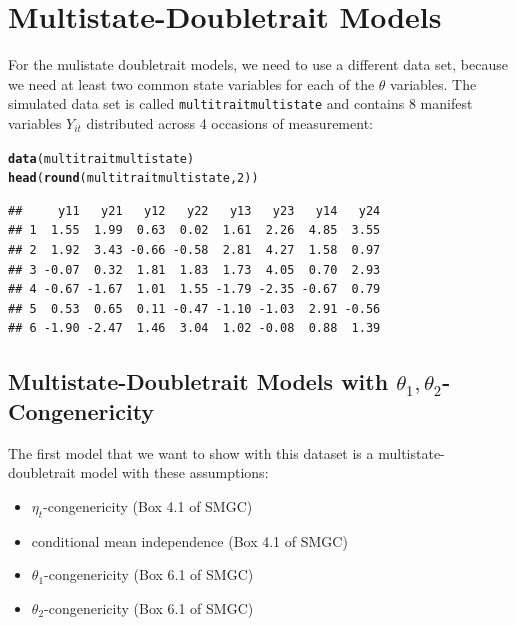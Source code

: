 \documentclass[10pt]{article}\usepackage{graphicx, color}
\makeatletter
\newcommand{\hlfunctioncall}[1]{\textcolor[rgb]{0.501960784313725,0,0.329411764705882}{\textbf{#1}}}%
\newenvironment{kframe}{%
 \def\at@end@of@kframe{}%
 \ifinner\ifhmode%
  \def\at@end@of@kframe{\end{minipage}}%
  \begin{minipage}{\columnwidth}%
 \fi\fi%
 \def\FrameCommand##1{\hskip\@totalleftmargin \hskip-\fboxsep
 \colorbox{shadecolor}{##1}\hskip-\fboxsep
     \hskip-\linewidth \hskip-\@totalleftmargin \hskip\columnwidth}%
 \MakeFramed {\advance\hsize-\width
   \@totalleftmargin\z@ \linewidth\hsize
   \@setminipage}}%
 {\par\unskip\endMakeFramed%
 \at@end@of@kframe}
\newenvironment{knitrout}{}{} %
\makeatother
\begin{document}
%



\newpage
\section{Multistate-Doubletrait Models}

For the mulistate doubletrait models, we need to use a different data set, because we need at least two common state variables for each of the $\theta$ variables. The simulated data set is called \texttt{multitraitmultistate} and contains 8 manifest variables $Y_{it}$ distributed across 4 occasions of measurement:

%
\begin{knitrout}
\color{fgcolor}\begin{kframe}
\begin{alltt}
\hlfunctioncall{data}(multitraitmultistate)
\hlfunctioncall{head}(\hlfunctioncall{round}(multitraitmultistate, 2))
\end{alltt}
\begin{verbatim}
##     y11   y21   y12   y22   y13   y23   y14   y24
## 1  1.55  1.99  0.63  0.02  1.61  2.26  4.85  3.55
## 2  1.92  3.43 -0.66 -0.58  2.81  4.27  1.58  0.97
## 3 -0.07  0.32  1.81  1.83  1.73  4.05  0.70  2.93
## 4 -0.67 -1.67  1.01  1.55 -1.79 -2.35 -0.67  0.79
## 5  0.53  0.65  0.11 -0.47 -1.10 -1.03  2.91 -0.56
## 6 -1.90 -2.47  1.46  3.04  1.02 -0.08  0.88  1.39
\end{verbatim}
\end{kframe}
\end{knitrout}

%



\subsection{Multistate-Doubletrait Models with $\theta_1,\theta_2$-Congenericity}


The first model that we want to show with this dataset is a multistate-doubletrait model with these assumptions:
%
\begin{itemize}
  \item $\eta_t$-congenericity (Box 4.1 of SMGC)
  \item conditional mean independence (Box 4.1 of SMGC)
  \item $\theta_1$-congenericity (Box 6.1 of SMGC)
  \item $\theta_2$-congenericity (Box 6.1 of SMGC)
\end{itemize}
%
\end{document}
